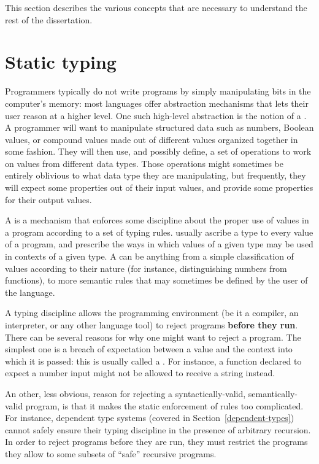 This section describes the various concepts that are necessary to understand the
rest of the dissertation.

\section{Static typing}
\label{static-typing}



Programmers typically do not write programs by simply manipulating bits in the
computer's memory: most languages offer abstraction mechanisms that lets their
user reason at a higher level.  One such high-level abstraction is the notion of
a .  A programmer will want to manipulate structured data such
as numbers, Boolean values, or compound values made out of different values
organized together in some fashion.  They will then use, and possibly define, a
set of operations to work on values from different data types.  Those operations
might sometimes be entirely oblivious to what data type they are manipulating,
but frequently, they will expect some properties out of their input values, and
provide some properties for their output values.

A  is a mechanism that enforces some discipline about
the proper use of values in a program according to a set of typing rules.
 usually ascribe a type to every value of a program, and
prescribe the ways in which values of a given type may be used in contexts of a
given type.  A  can be anything from a simple classification of
values according to their nature (for instance, distinguishing numbers from
functions), to more semantic rules that may sometimes be defined by the user of
the language.

A  typing discipline allows the programming environment (be it a
compiler, an interpreter, or any other language tool) to reject programs
\textbf{before they run}.  There can be several reasons for why one might want
to reject a program.  The simplest one is a breach of expectation between a
value and the context into which it is passed: this is usually called a
.  For instance, a function declared to expect a number input
might not be allowed to receive a string instead.

An other, less obvious, reason for rejecting a syntactically-valid,
semantically-valid program, is that it makes the static enforcement of rules too
complicated.  For instance, dependent type systems (covered
in Section~\ref{dependent-types}) cannot safely ensure their typing discipline in the
presence of arbitrary recursion.  In order to reject programs before they are
run, they must restrict the programs they allow to some subsets of ``safe''
recursive programs.

